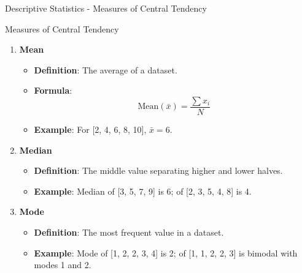 \documentclass[aspectratio=169]{beamer}
\begin{document}
\begin{frame}[fragile]{Descriptive Statistics - Measures of Central Tendency}
    \begin{block}{Measures of Central Tendency}
        \begin{enumerate}
            \item \textbf{Mean}
                \begin{itemize}
                    \item \textbf{Definition}: The average of a dataset.
                    \item \textbf{Formula}:
                        \begin{equation}
                        \text{Mean} (\bar{x}) = \frac{\sum{x_i}}{N}
                        \end{equation}
                    \item \textbf{Example}: For [2, 4, 6, 8, 10], $\bar{x} = 6$.
                \end{itemize}

            \item \textbf{Median}
                \begin{itemize}
                    \item \textbf{Definition}: The middle value separating higher and lower halves.
                    \item \textbf{Example}: Median of [3, 5, 7, 9] is 6; of [2, 3, 5, 4, 8] is 4.
                \end{itemize}

            \item \textbf{Mode}
                \begin{itemize}
                    \item \textbf{Definition}: The most frequent value in a dataset.
                    \item \textbf{Example}: Mode of [1, 2, 2, 3, 4] is 2; of [1, 1, 2, 2, 3] is bimodal with modes 1 and 2.
                \end{itemize}
        \end{enumerate}
    \end{block}
\end{frame}
\end{document}
